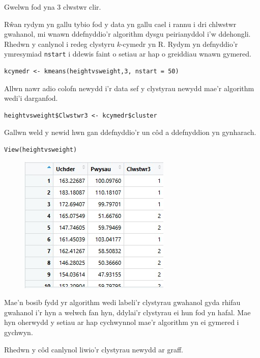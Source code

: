 Gwelwn fod yna 3 clwstwr clir. 

R\^{w}an rydym yn gallu tybio fod y data yn gallu cael i rannu i dri chlwstwr gwahanol, mi wnawn ddefnyddio'r algorithm dysgu peirianyddol i'w ddehongli. Rhedwn y canlynol i redeg clystyru $k$-cymedr yn R. Rydym yn defnyddio'r ymresymiad \texttt{nstart} i ddewis faint o setiau ar hap o greiddiau wnawn gymered.

\begin{verbatim}
kcymedr <- kmeans(heightvsweight,3, nstart = 50)
\end{verbatim}

Allwn nawr adio colofn newydd i'r data sef y clystyrau newydd mae'r algorithm wedi'i darganfod.

\begin{verbatim}
heightvsweight$Clwstwr3 <- kcymedr$cluster
\end{verbatim}

Gallwn weld y newid hwn gan ddefnyddio'r un c\^{o}d a ddefnyddion yn gynharach.

\begin{verbatim}
View(heightvsweight)
\end{verbatim}

\begin{figure}[H]
\begin{center}
\includegraphics[width=0.5\linewidth]{../img/Data3_yn_R.jpg}
\end{center}
\end{figure}

Mae'n bosib fydd yr algorithm wedi labeli'r clystyrau gwahanol gyda rhifau gwahanol i'r hyn a welwch fan hyn, ddylai'r clystyrau ei hun fod yn hafal. Mae hyn oherwydd y setiau ar hap cychwynnol mae'r algorithm yn ei gymered i gychwyn.

Rhedwn y c\^{o}d canlynol liwio'r clystyrau newydd ar graff.

